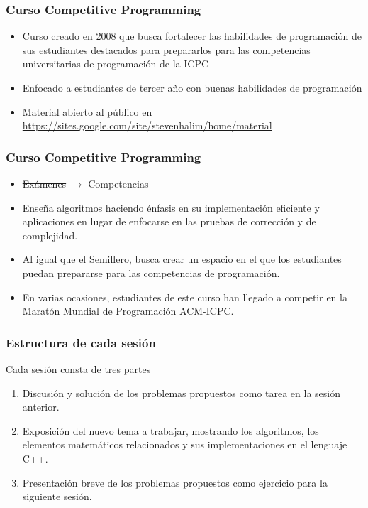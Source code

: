 \documentclass{beamer}
\begin{document}
	\begin{frame}
		\frametitle{Curso Competitive Programming}
		\begin{itemize}
			\item{Curso creado en 2008 que busca fortalecer las habilidades de programación de sus estudiantes destacados para prepararlos para las competencias universitarias de programación de la ICPC}
			\item{Enfocado a estudiantes de tercer año con buenas habilidades de programación}
			\item{Material abierto al público en \url{https://sites.google.com/site/stevenhalim/home/material}}
		\end{itemize}
	\end{frame}
	
	\begin{frame}
		\frametitle{Curso Competitive Programming}
		\begin{itemize}
			\item \sout{Exámenes} $\rightarrow$ Competencias %
			\item Enseña algoritmos haciendo énfasis en su implementación eficiente y aplicaciones en lugar de enfocarse en las pruebas de corrección y de complejidad.
			\item Al igual que el Semillero, busca crear un espacio en el que los estudiantes puedan prepararse para las competencias de programación.
			\item En varias ocasiones, estudiantes de este curso han llegado a competir en la Maratón Mundial de Programación ACM-ICPC.
		\end{itemize}
	\end{frame}
	
	\begin{frame}
		\frametitle{Estructura de cada sesión}
		Cada sesión consta de tres partes
		\begin{enumerate}
			\item{Discusión y solución de los problemas propuestos como tarea en la sesión anterior.}
			\item{Exposición del nuevo tema a trabajar, mostrando los algoritmos, los elementos matemáticos relacionados y sus implementaciones en el lenguaje C++.}
			\item{Presentación breve de los problemas propuestos como ejercicio para la siguiente sesión.}
		\end{enumerate}
	\end{frame}
	
\end{document}
